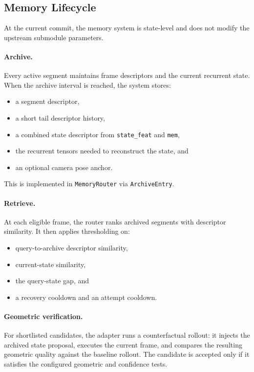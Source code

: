 \documentclass[11pt]{article}
\begin{document}
\subsection{Memory Lifecycle}
At the current commit, the memory system is state-level and does not modify the
upstream submodule parameters.

\paragraph{Archive.}
Every active segment maintains frame descriptors and the current recurrent state.
When the archive interval is reached, the system stores:
\begin{itemize}
\item a segment descriptor,
\item a short tail descriptor history,
\item a combined state descriptor from \texttt{state\_feat} and \texttt{mem},
\item the recurrent tensors needed to reconstruct the state, and
\item an optional camera pose anchor.
\end{itemize}
This is implemented in \texttt{MemoryRouter} via \texttt{ArchiveEntry}.

\paragraph{Retrieve.}
At each eligible frame, the router ranks archived segments with descriptor
similarity. It then applies thresholding on:
\begin{itemize}
\item query-to-archive descriptor similarity,
\item current-state similarity,
\item the query-state gap, and
\item a recovery cooldown and an attempt cooldown.
\end{itemize}

\paragraph{Geometric verification.}
For shortlisted candidates, the adapter runs a counterfactual rollout: it
injects the archived state proposal, executes the current frame, and compares
the resulting geometric quality against the baseline rollout. The candidate is
accepted only if it satisfies the configured geometric and confidence tests.
\end{document}
